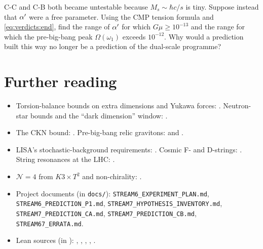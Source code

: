 \begin{exercise}[$\star\star\star$]
C-C and C-B both became untestable because $M_s\sim\hbar c/s$ is tiny. Suppose instead that
$\alpha'$ were a free parameter. Using the CMP tension formula and \eqref{eq:verdicts:end}, find
the range of $\alpha'$ for which $G\mu\ge10^{-13}$ and the range for which the pre-big-bang peak
$\Omega(\omega_1)$ exceeds $10^{-12}$. Why would a prediction built this way no longer be a
prediction of the dual-scale programme?
\end{exercise}

\section*{Further reading}
\begin{sloppypar}
\begin{itemize}[leftmargin=*,itemsep=1pt]
\item Torsion-balance bounds on extra dimensions and Yukawa forces: .
 Neutron-star bounds and the ``dark dimension'' window: .
\item The CKN bound: . Pre-big-bang relic gravitons:
  and .
\item LISA's stochastic-background requirements: . Cosmic F- and
 D-strings: . String resonances at the LHC:
 .
\item $\mathcal N=4$ from $K3\times T^2$ and non-chirality: .
\item Project documents (in \texttt{docs/}):
 \texttt{STREAM6\_}\allowbreak\texttt{EXPERIMENT\_PLAN.md},
 \texttt{STREAM6\_}\allowbreak\texttt{PREDICTION\_P1.md},
 \texttt{STREAM7\_}\allowbreak\texttt{HYPOTHESIS\_INVENTORY.md},
 \texttt{STREAM7\_}\allowbreak\texttt{PREDICTION\_CA.md},
 \texttt{STREAM7\_}\allowbreak\texttt{PREDICTION\_CB.md},
 \texttt{STREAM67\_ERRATA.md}.
\item Lean sources (in ):
 , , ,
 , .
\end{itemize}
\end{sloppypar}
